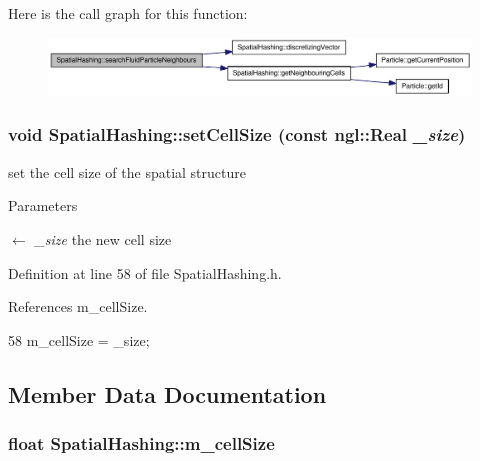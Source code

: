 Here is the call graph for this function:\nopagebreak
\begin{figure}[H]
\begin{center}
\leavevmode
\includegraphics[width=326pt]{class_spatial_hashing_af5c8f67520bfd03e32800e87af56ffba_cgraph}
\end{center}
\end{figure}


\hypertarget{class_spatial_hashing_a430ce0c699a8ef34a5f8f152d59f06a8}{
\subsubsection[{setCellSize}]{\setlength{\rightskip}{0pt plus 5cm}void SpatialHashing::setCellSize (const ngl::Real {\em \_\-size})}}
\label{class_spatial_hashing_a430ce0c699a8ef34a5f8f152d59f06a8}


set the cell size of the spatial structure 


\begin{DoxyParams}{Parameters}
\item[\mbox{$\leftarrow$} {\em \_\-size}]the new cell size \end{DoxyParams}


Definition at line 58 of file SpatialHashing.h.



References m\_\-cellSize.




\begin{DoxyCode}
58 { m_cellSize = _size; }
\end{DoxyCode}




\subsection{Member Data Documentation}
\hypertarget{class_spatial_hashing_aed10321da282b758d14dd3112749197c}{
\subsubsection[{m\_\-cellSize}]{\setlength{\rightskip}{0pt plus 5cm}float {\bf SpatialHashing::m\_\-cellSize}}}
\label{class_spatial_hashing_aed10321da282b758d14dd3112749197c}


